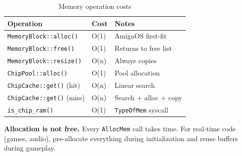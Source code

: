 \begin{table}[h]
\centering
\begin{tabular}{lll}
\textbf{Operation} & \textbf{Cost} & \textbf{Notes} \\
\hline
\texttt{MemoryBlock::alloc()} & O(1) & AmigaOS first-fit \\
\texttt{MemoryBlock::free()} & O(1) & Returns to free list \\
\texttt{MemoryBlock::resize()} & O(n) & Always copies \\
\texttt{ChipPool::alloc()} & O(1) & Pool allocation \\
\texttt{ChipCache::get()} (hit) & O(n) & Linear search \\
\texttt{ChipCache::get()} (miss) & O(n) & Search + alloc + copy \\
\texttt{is\_chip\_ram()} & O(1) & \texttt{TypeOfMem} syscall \\
\end{tabular}
\caption{Memory operation costs}
\end{table}

\begin{tipbox}
\textbf{Allocation is not free.} Every \texttt{AllocMem} call takes time. For real-time code (games, audio), pre-allocate everything during initialization and reuse buffers during gameplay.
\end{tipbox}
